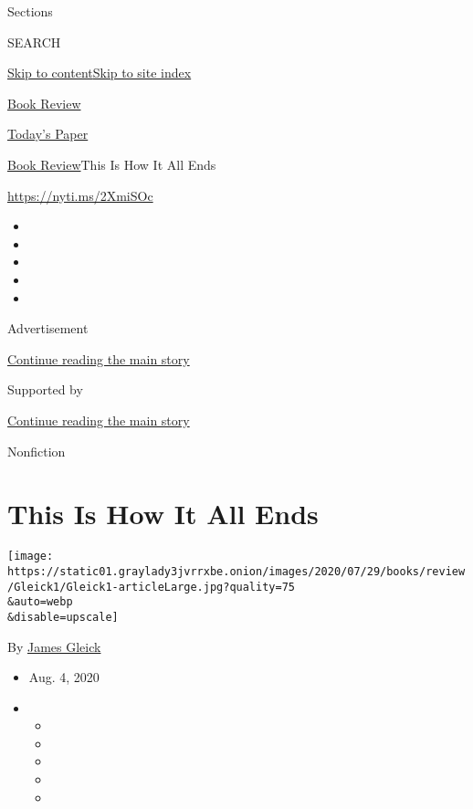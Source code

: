 Sections

SEARCH

\protect\hyperlink{site-content}{Skip to
content}\protect\hyperlink{site-index}{Skip to site index}

\href{https://www.nytimes3xbfgragh.onion/section/books/review}{Book
Review}

\href{https://myaccount.nytimes3xbfgragh.onion/auth/login?response_type=cookie\&client_id=vi}{}

\href{https://www.nytimes3xbfgragh.onion/section/todayspaper}{Today's
Paper}

\href{/section/books/review}{Book Review}\textbar{}This Is How It All
Ends

\url{https://nyti.ms/2XmiSOc}

\begin{itemize}
\item
\item
\item
\item
\item
\end{itemize}

Advertisement

\protect\hyperlink{after-top}{Continue reading the main story}

Supported by

\protect\hyperlink{after-sponsor}{Continue reading the main story}

Nonfiction

\hypertarget{this-is-how-it-all-ends}{%
\section{This Is How It All Ends}\label{this-is-how-it-all-ends}}

\texttt{[image: https://static01.graylady3jvrrxbe.onion/images/2020/07/29/books/review/Gleick1/Gleick1-articleLarge.jpg?quality=75\\\&auto=webp\\\&disable=upscale]}

By \href{https://www.nytimes3xbfgragh.onion/by/james-gleick}{James
Gleick}

\begin{itemize}
\item
  Aug. 4, 2020
\item
  \begin{itemize}
  \item
  \item
  \item
  \item
  \item
  \end{itemize}
\end{itemize}

